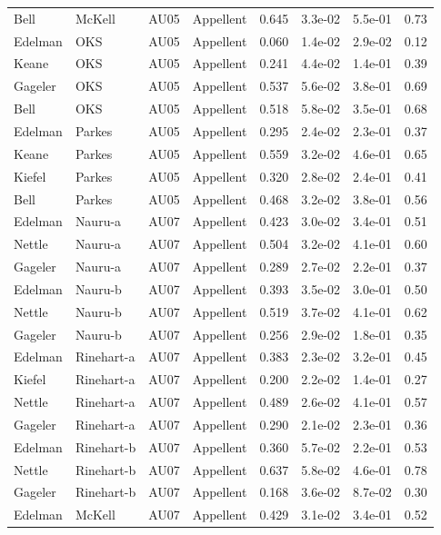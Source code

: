 \documentclass{monashthesis}
\begin{document}
\begin{center}
\begin{longtable}{llllllll}
Bell & McKell & AU05 & Appellent & 0.645 & 3.3e-02 & 5.5e-01 & 0.73 \\
Edelman & OKS & AU05 & Appellent & 0.060 & 1.4e-02 & 2.9e-02 & 0.12 \\
Keane & OKS & AU05 & Appellent & 0.241 & 4.4e-02 & 1.4e-01 & 0.39 \\
Gageler & OKS & AU05 & Appellent & 0.537 & 5.6e-02 & 3.8e-01 & 0.69 \\
Bell & OKS & AU05 & Appellent & 0.518 & 5.8e-02 & 3.5e-01 & 0.68 \\
Edelman & Parkes & AU05 & Appellent & 0.295 & 2.4e-02 & 2.3e-01 & 0.37 \\
Keane & Parkes & AU05 & Appellent & 0.559 & 3.2e-02 & 4.6e-01 & 0.65 \\
Kiefel & Parkes & AU05 & Appellent & 0.320 & 2.8e-02 & 2.4e-01 & 0.41 \\
Bell & Parkes & AU05 & Appellent & 0.468 & 3.2e-02 & 3.8e-01 & 0.56 \\
Edelman & Nauru-a & AU07 & Appellent & 0.423 & 3.0e-02 & 3.4e-01 & 0.51 \\
Nettle & Nauru-a & AU07 & Appellent & 0.504 & 3.2e-02 & 4.1e-01 & 0.60 \\
Gageler & Nauru-a & AU07 & Appellent & 0.289 & 2.7e-02 & 2.2e-01 & 0.37 \\
Edelman & Nauru-b & AU07 & Appellent & 0.393 & 3.5e-02 & 3.0e-01 & 0.50 \\
Nettle & Nauru-b & AU07 & Appellent & 0.519 & 3.7e-02 & 4.1e-01 & 0.62 \\
Gageler & Nauru-b & AU07 & Appellent & 0.256 & 2.9e-02 & 1.8e-01 & 0.35 \\
Edelman & Rinehart-a & AU07 & Appellent & 0.383 & 2.3e-02 & 3.2e-01 & 0.45 \\
Kiefel & Rinehart-a & AU07 & Appellent & 0.200 & 2.2e-02 & 1.4e-01 & 0.27 \\
Nettle & Rinehart-a & AU07 & Appellent & 0.489 & 2.6e-02 & 4.1e-01 & 0.57 \\
Gageler & Rinehart-a & AU07 & Appellent & 0.290 & 2.1e-02 & 2.3e-01 & 0.36 \\
Edelman & Rinehart-b & AU07 & Appellent & 0.360 & 5.7e-02 & 2.2e-01 & 0.53 \\
Nettle & Rinehart-b & AU07 & Appellent & 0.637 & 5.8e-02 & 4.6e-01 & 0.78 \\
Gageler & Rinehart-b & AU07 & Appellent & 0.168 & 3.6e-02 & 8.7e-02 & 0.30 \\
Edelman & McKell & AU07 & Appellent & 0.429 & 3.1e-02 & 3.4e-01 & 0.52 \\

\end{longtable}
\end{center}
\end{document}
